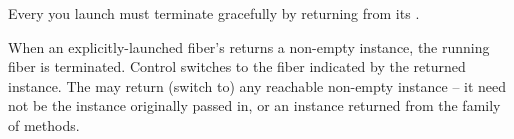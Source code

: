 \label{termination}

Every \fiber you launch must
terminate gracefully by returning from its \entryfn.

When an explicitly-launched fiber's \entryfn returns a non-empty \fiber
instance, the running fiber is terminated. Control switches to the fiber
indicated by the returned \fiber instance. The \entryfn may return (switch to)
any reachable non-empty \fiber instance -- it need not be the instance originally
passed in, or an instance returned from the \resume family of methods.

